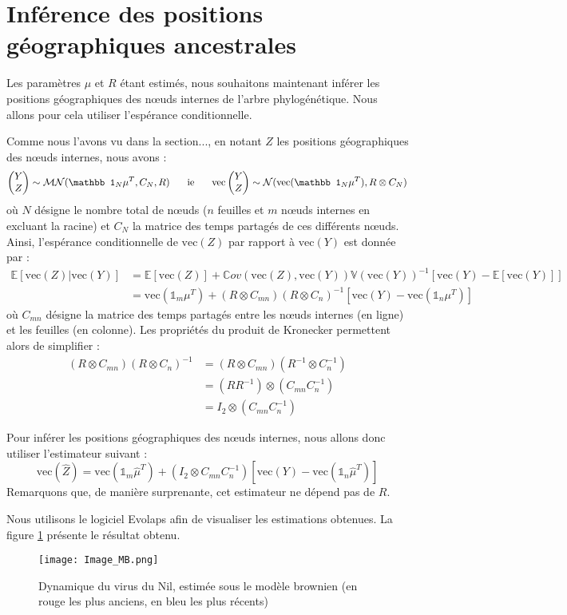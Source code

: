 \documentclass[a4paper,10pt]{article}
\newcommand{\hs}[1]{\hspace{#1cm}}
\begin{document}
\section{Inférence des positions géographiques ancestrales}

Les paramètres $\mu$ et $R$ étant estimés, nous souhaitons maintenant inférer les positions géographiques des nœuds internes de l'arbre phylogénétique. Nous allons pour cela utiliser l'espérance conditionnelle.

Comme nous l'avons vu {\red dans la section...}, en notant $Z$ les positions géographiques des nœuds internes, nous avons :
$$\begin{pmatrix}
   Y\\Z
  \end{pmatrix}
\sim \mathcal{MN}(\mathbb 1_N\mu^T,C_N, R)
\hs{.5}\text{ ie }\hs{.5} \text{vec}\begin{pmatrix}
                       Y\\Z
                      \end{pmatrix}
\sim \mathcal N(\text{vec}(\mathbb 1_N\mu^T), R\otimes C_N)$$
où $N$ désigne le nombre total de nœuds ($n$ feuilles et $m$ nœuds internes en excluant la racine) et $C_N$ la matrice des temps partagés de ces différents nœuds. Ainsi, l'espérance conditionnelle de $\text{vec}(Z)$ par rapport à $\text{vec}(Y)$ est donnée par :
$$\begin{array}{ll}
\mathbb E\left[\text{vec}(Z)|\text{vec}(Y)\right]
&=\mathbb E\left[\text{vec}(Z)\right]+\mathbb Cov\left(\text{vec}(Z),\text{vec}(Y)\right)\mathbb V(\text{vec}(Y))^{-1}\left[\text{vec}(Y)-\mathbb E\left[\text{vec}(Y)\right]\right]\\
&=\text{vec}(\mathbb 1_m\mu^T)+(R\otimes C_{mn})(R\otimes C_n)^{-1}\left[\text{vec}(Y)-\text{vec}(\mathbb 1_n\mu^T)\right]
\end{array}$$
où $C_{mn}$ désigne la matrice des temps partagés entre les nœuds internes (en ligne) et les feuilles (en colonne).
Les propriétés du produit de Kronecker permettent alors de simplifier :
$$\begin{array}{ll}
   (R\otimes C_{mn})(R\otimes C_n)^{-1}
   &= (R\otimes C_{mn})(R^{-1}\otimes C_n^{-1})\\
   &= (RR^{-1})\otimes (C_{mn}C_n^{-1})\\
   &= I_2\otimes (C_{mn}C_n^{-1})
  \end{array}$$

Pour inférer les positions géographiques des nœuds internes, nous allons donc utiliser l'estimateur suivant :
$$\text{vec}(\widehat Z)=\text{vec}(\mathbb 1_m\widehat\mu^T)+(I_2\otimes C_{mn}C_n^{-1})\left[\text{vec}(Y)-\text{vec}(\mathbb 1_n\widehat\mu^T)\right]$$
Remarquons que, de manière surprenante, cet estimateur ne dépend pas de $R$. 

Nous utilisons le logiciel Evolaps afin de visualiser les estimations obtenues. La figure \ref{MB} présente le résultat obtenu.  


\begin{figure}[!h]
\centering
\texttt{[image: Image\_MB.png]}
\caption{Dynamique du virus du Nil, estimée sous le modèle brownien (en rouge les plus anciens, en bleu les plus récents)}
\label{MB}
\end{figure}
\end{document}
